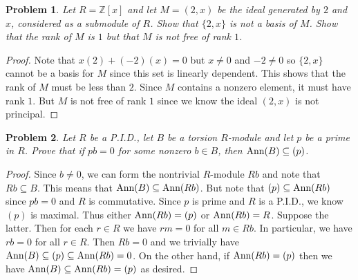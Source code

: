 \documentclass{article}
\newcommand{\ann}{\textup{Ann}}
\newtheorem{problem}{Problem}
\begin{document}

\begin{problem}
Let $R = \mathbb{Z}[x]$ and let $M = (2,x)$ be the ideal generated by $2$ and $x$, considered as a submodule of $R$. Show that $\{2,x\}$ is not a basis of $M$. Show that the rank of $M$ is $1$ but that $M$ is not free of rank $1$.
\end{problem}
\begin{proof}
Note that $x(2) + (-2)(x) = 0$ but $x \neq 0$ and $-2 \neq 0$ so $\{2, x\}$ cannot be a basis for $M$ since this set is linearly dependent. This shows that the rank of $M$ must be less than $2$. Since $M$ contains a nonzero element, it must have rank $1$. But $M$ is not free of rank $1$ since we know the ideal $(2,x)$ is not principal.
\end{proof}

\begin{problem}
Let $R$ be a P.I.D., let $B$ be a torsion $R$-module and let $p$ be a prime in $R$. Prove that if $pb = 0$ for some nonzero $b \in B$, then $\ann(B) \subseteq (p)$.
\end{problem}
\begin{proof}
Since $b \neq 0$, we can form the nontrivial $R$-module $Rb$ and note that $Rb \subseteq B$. This means that $\ann(B) \subseteq \ann(Rb)$. But note that $(p) \subseteq \ann(Rb)$ since $pb = 0$ and $R$ is commutative. Since $p$ is prime and $R$ is a P.I.D., we know $(p)$ is maximal. Thus either $\ann(Rb) = (p)$ or $\ann(Rb) = R$. Suppose the latter. Then for each $r \in R$ we have $rm = 0$ for all $m \in Rb$. In particular, we have $rb = 0$ for all $r \in R$. Then $Rb = 0$ and we trivially have $\ann(B) \subseteq (p) \subseteq \ann(Rb) = 0$. On the other hand, if $\ann(Rb) = (p)$ then we have $\ann(B) \subseteq \ann(Rb) = (p)$ as desired.
\end{proof}
\end{document}
